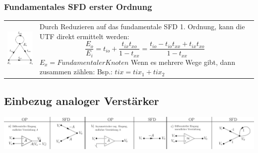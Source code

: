 \subsubsection{Fundamentales SFD erster Ordnung }
\begin{tabular}{ll}
	\parbox{7cm}{
    	\includegraphics[width=3cm]{./images/sfd-fundamental-erster-ordnung.png}
    }
    & \parbox{12cm}{
		Durch Reduzieren auf das fundamentale SFD 1. Ordnung, kann die UTF direkt
		ermittelt werden: \\
		$$\frac{E_o}{E_i}=
		t_{io}+\frac{t_{ix}t_{xo}}{1-t_{xx}}=
		\frac{t_{io}-t_{io}t_{xx}+t_{ix}t_{xo}}{1-t_{xx}}$$\\
		$E_x = Fundamentaler Knoten$\\
    Wenn es mehrere Wege gibt, dann zusammen zählen: Bsp.: $tix = tix_1 +
    tix_2$
	}
\end{tabular}


\subsection{Einbezug analoger Verstärker }
\includegraphics[width=18cm]{./images/sfd-op.png}


